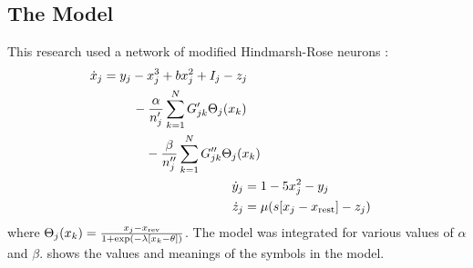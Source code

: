 \documentclass{beamer}
\newcommand{\hrx}{x}
\newcommand{\hry}{y}
\newcommand{\hrz}{z}
\newcommand{\hra}{\alpha}
\newcommand{\hrb}{\beta}
\begin{document}
\begin{frame}[t]
\begin{multicols}{3}
    \section{The Model}
    This research used a network of modified Hindmarsh-Rose neurons \cite{Santos2017}:
    \begin{align}
      \label{eq:hr_x}
      \begin{split}
      \dot{\hrx}_{j}
      ={}&
        \hry_{j}
        -
        \hrx_{j}^{3}
        +
        b \hrx_{j}^{2}
        +
        I_{j}
        -
        \hrz_{j} \\
        &\quad -
        \frac{\hra}{n'_{j}} \sum_{k ={} 1}^{N} G'_{j k} \Theta_{j}(\hrx_{k}) \\
        &\qquad -
        \frac{\hrb}{n''_{j}} \sum_{k ={} 1}^{N} G''_{j k} \Theta_{j}(\hrx_{k})
      \end{split} \\
      \label{eq:hr_y}
      \dot{\hry}_{j}
      ={}&
        1
        -
        5 \hrx_{j}^{2}
        -
        \hry_{j} \\
      \label{eq:hr_z}
      \dot{\hrz}_{j}
      ={}&
        \mu \pqty{s \bqty{\hrx_{j} - \hrx_{\text{rest}}} - \hrz_{j}}
    \end{align}
    where $\Theta_{j}(\hrx_{k})
      =
      \frac{\hrx_{j} - \hrx_{\text{rev}}}{1 + \exp(-\lambda \bqty{\hrx_{k} - \theta})}$.
      The model was integrated for various values of $\hra$ and $\hrb$.
       shows the values and meanings of the symbols in the model.


\end{multicols}
\end{frame}
\end{document}
